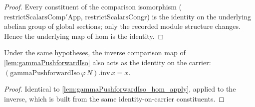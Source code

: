 \begin{proof}
  Every constituent of the comparison isomorphism
  (\(\mathrm{restrictScalarsComp'App}\), \(\mathrm{restrictScalarsCongr}\)) is the identity
  on the underlying abelian group of global sections; only the recorded module structure
  changes. Hence the underlying map of \(\mathrm{hom}\) is the identity.
\end{proof}

\begin{lemma}


  \label{lem:gammaPushforwardIso_inv_apply}
  Under the same hypotheses, the inverse comparison map of \cref{lem:gammaPushforwardIso}
  also acts as the identity on the carrier: \((\mathrm{gammaPushforwardIso}\,\varphi\,N).\mathrm{inv}\,x = x\).
\end{lemma}

\begin{proof}
  Identical to \cref{lem:gammaPushforwardIso_hom_apply}, applied to the inverse, which is
  built from the same identity-on-carrier constituents.
\end{proof}

